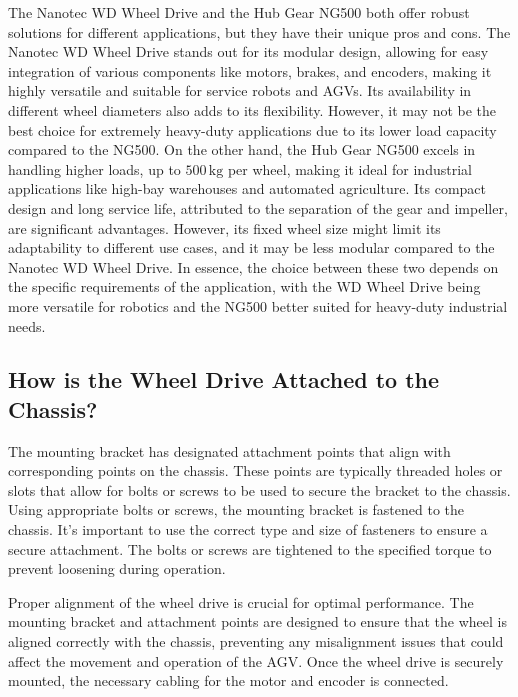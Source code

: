 \documentclass[../../main]{subfiles}
\begin{document}
The Nanotec WD Wheel Drive and the Hub Gear NG500 both offer robust solutions for different applications, but they have their unique pros and cons. The Nanotec WD Wheel Drive stands out for its modular design, allowing for easy integration of various components like motors, brakes, and encoders, making it highly versatile and suitable for service robots and AGVs. Its availability in different wheel diameters also adds to its flexibility. However, it may not be the best choice for extremely heavy-duty applications due to its lower load capacity compared to the NG500. On the other hand, the Hub Gear NG500 excels in handling higher loads, up to $500 \, \mathrm{kg}$ per wheel, making it ideal for industrial applications like high-bay warehouses and automated agriculture. Its compact design and long service life, attributed to the separation of the gear and impeller, are significant advantages. However, its fixed wheel size might limit its adaptability to different use cases, and it may be less modular compared to the Nanotec WD Wheel Drive. In essence, the choice between these two depends on the specific requirements of the application, with the WD Wheel Drive being more versatile for robotics and the NG500 better suited for heavy-duty industrial needs.

\subsection{How is the Wheel Drive Attached to the Chassis?}
The mounting bracket has designated attachment points that align with corresponding points on the chassis. These points are typically threaded holes or slots that allow for bolts or screws to be used to secure the bracket to the chassis. Using appropriate bolts or screws, the mounting bracket is fastened to the chassis. It's important to use the correct type and size of fasteners to ensure a secure attachment. The bolts or screws are tightened to the specified torque to prevent loosening during operation.

Proper alignment of the wheel drive is crucial for optimal performance. The mounting bracket and attachment points are designed to ensure that the wheel is aligned correctly with the chassis, preventing any misalignment issues that could affect the movement and operation of the AGV. Once the wheel drive is securely mounted, the necessary cabling for the motor and encoder is connected.
\end{document}
